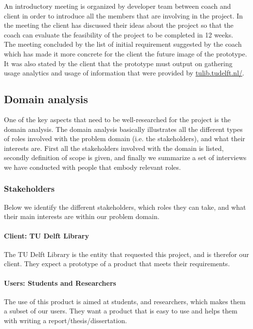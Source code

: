 An introductory meeting is organized by developer team between coach and client in order to introduce all the members that are involving in the project. In the meeting the client has discussed their ideas about the project so that the coach can evaluate the feasibility of the project to be completed in 12 weeks.\\
The meeting concluded by the list of initial requirement suggested by the coach which has made it more concrete for the client the future image of the prototype. It was also stated by the client that the prototype must output on gathering usage analytics and usage of information that were provided by \url{tulib.tudelft.nl/}.\\ 


\subsection{Domain analysis} %

One of the key aspects that need to be well-researched for the project is the domain analysis. The domain analysis basically illustrates all the different types of roles involved with the problem domain (i.e. the stakeholders), and what their interests are. First all the stakeholders involved with the domain is listed, secondly definition of scope is given, and finally we summarize a set of interviews we have conducted with people that embody relevant roles.

\subsubsection{Stakeholders} %

Below we identify the different stakeholders, which roles they can take, and what their main interests are within our problem domain.

\paragraph{Client: TU Delft Library} The TU Delft Library is the entity that requested this project, and is therefor our client. They expect a prototype of a product that meets their requirements.

\paragraph{Users: Students and Researchers} The use of this product is aimed at students, and researchers, which makes them a subset of our users. They want a product that is easy to use and helps them with writing a report/thesis/dissertation.

